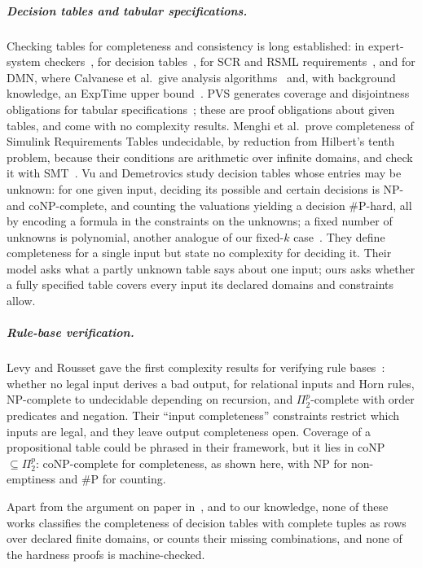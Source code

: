 \documentclass[pdflatex,sn-mathphys-num]{sn-jnl}
\theoremstyle{thmstyleone}
\theoremstyle{thmstylethree}
\begin{document}
\subparagraph*{Decision tables and tabular specifications.}
Checking tables for completeness and consistency is long established: in expert-system
checkers~\cite{SuwaScottShortliffe1982}, for decision tables~\cite{VanthienenMA1998}, for SCR and
RSML requirements~\cite{HeitmeyerJL1996,HeimdahlLeveson1996}, and for DMN, where Calvanese et al.\
give analysis algorithms~\cite{CalvaneseDLMMT2016,CalvaneseDLMMT2018} and, with background
knowledge, an ExpTime upper bound~\cite{CalvaneseMDM2019}. PVS generates coverage and
disjointness obligations for tabular specifications~\cite{OwreRushbyShankar1997}; these are
proof obligations about given tables, and come with no complexity results. Menghi et al.\ prove
completeness of Simulink Requirements Tables undecidable, by reduction from Hilbert's tenth
problem, because their conditions are arithmetic over infinite domains, and check it with
SMT~\cite{MenghiEtAl2025,ZanengaEtAl2025}. Vu and Demetrovics study decision tables whose entries
may be unknown: for one given input, deciding its possible and certain decisions is NP- and
coNP-complete, and counting the valuations yielding a decision \#P-hard, all by encoding a formula
in the constraints on the unknowns; a fixed number of unknowns is polynomial, another analogue of
our fixed-$k$ case~\cite{VuDemetrovics2026}. They define completeness for a single input but state
no complexity for deciding it. Their model asks what a partly unknown table says about one input;
ours asks whether a fully specified table covers every input its declared domains and constraints
allow.

\subparagraph*{Rule-base verification.}
Levy and Rousset gave the first complexity results for verifying rule
bases~\cite{LevyRousset1996,LevyRousset1998}: whether no legal input derives a bad output, for
relational inputs and Horn rules, NP-complete to undecidable depending on recursion, and
$\Pi_2^p$-complete with order predicates and negation. Their ``input completeness'' constraints
restrict which inputs are legal, and they leave output completeness open. Coverage of a
propositional table could be phrased in their framework, but it lies in coNP~$\subseteq \Pi_2^p$:
coNP-complete for completeness, as shown here, with NP for non-emptiness and \#P for counting.

Apart from the argument on paper in~\cite{PaperA}, and to our knowledge, none of these works
classifies the completeness of decision tables with complete
tuples as rows over declared finite domains, or counts their missing combinations, and none of the
hardness proofs is machine-checked.
\end{document}
